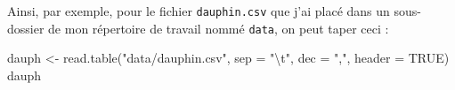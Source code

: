 \documentclass[
  a4paper,
  DIV=11,
  numbers=noendperiod,
  oneside]{scrreprt}
\newenvironment{Shaded}{}{}
\newcommand{\AttributeTok}[1]{\textcolor[rgb]{0.84,0.23,0.29}{#1}}
\newcommand{\ConstantTok}[1]{\textcolor[rgb]{0.00,0.36,0.77}{#1}}
\newcommand{\FunctionTok}[1]{\textcolor[rgb]{0.44,0.26,0.76}{#1}}
\newcommand{\NormalTok}[1]{\textcolor[rgb]{0.14,0.16,0.18}{#1}}
\newcommand{\OtherTok}[1]{\textcolor[rgb]{0.44,0.26,0.76}{#1}}
\newcommand{\SpecialCharTok}[1]{\textcolor[rgb]{0.00,0.36,0.77}{#1}}
\newcommand{\StringTok}[1]{\textcolor[rgb]{0.01,0.18,0.38}{#1}}
\begin{document}
Ainsi, par exemple, pour le fichier \texttt{dauphin.csv} que j'ai placé
dans un sous-dossier de mon répertoire de travail nommé \texttt{data},
on peut taper ceci :

\begin{Shaded}
\begin{Highlighting}[]
\NormalTok{dauph }\OtherTok{\textless{}{-}} \FunctionTok{read.table}\NormalTok{(}\StringTok{"data/dauphin.csv"}\NormalTok{,}
                    \AttributeTok{sep =} \StringTok{"}\SpecialCharTok{\textbackslash{}t}\StringTok{"}\NormalTok{,}
                    \AttributeTok{dec =} \StringTok{","}\NormalTok{,}
                    \AttributeTok{header =} \ConstantTok{TRUE}\NormalTok{)}
\NormalTok{dauph}
\end{Highlighting}
\end{Shaded}
\end{document}

